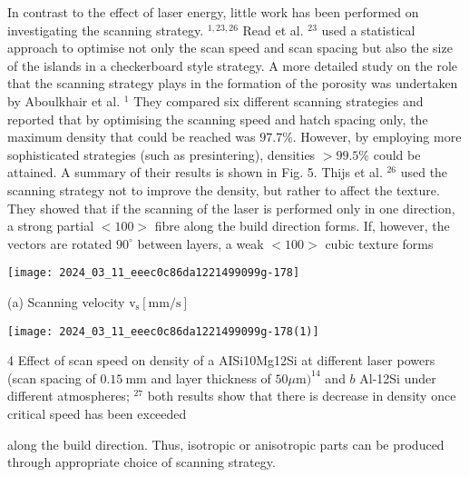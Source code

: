 \documentclass[10pt]{article}
\begin{document}
In contrast to the effect of laser energy, little work has been performed on investigating the scanning strategy. ${ }^{1,23,26}$ Read et al. ${ }^{23}$ used a statistical approach to optimise not only the scan speed and scan spacing but also the size of the islands in a checkerboard style strategy. A more detailed study on the role that the scanning strategy plays in the formation of the porosity was undertaken by Aboulkhair et al. ${ }^{1}$ They compared six different scanning strategies and reported that by optimising the scanning speed and hatch spacing only, the maximum density that could be reached was $97.7 \%$. However, by employing more sophisticated strategies (such as presintering), densities $>99.5 \%$ could be attained. A summary of their results is shown in Fig. 5. Thijs et al. ${ }^{26}$ used the scanning strategy not to improve the density, but rather to affect the texture. They showed that if the scanning of the laser is performed only in one direction, a strong partial $<100>$ fibre along the build direction forms. If, however, the vectors are rotated $90^{\circ}$ between layers, a weak $<100>$ cubic texture forms

\begin{center}
\texttt{[image: 2024\_03\_11\_eeec0c86da1221499099g-178]}
\end{center}

(a) Scanning velocity $\mathrm{v}_{\mathrm{s}}[\mathrm{mm} / \mathrm{s}]$

\begin{center}
\texttt{[image: 2024\_03\_11\_eeec0c86da1221499099g-178(1)]}
\end{center}

4 Effect of scan speed on density of a AISi10Mg12Si at different laser powers (scan spacing of $0.15 \mathrm{~mm}$ and layer thickness of $50 \mu \mathrm{m})^{14}$ and $b$ Al-12Si under different atmospheres; ${ }^{27}$ both results show that there is decrease in density once critical speed has been exceeded

along the build direction. Thus, isotropic or anisotropic parts can be produced through appropriate choice of scanning strategy.
\end{document}
